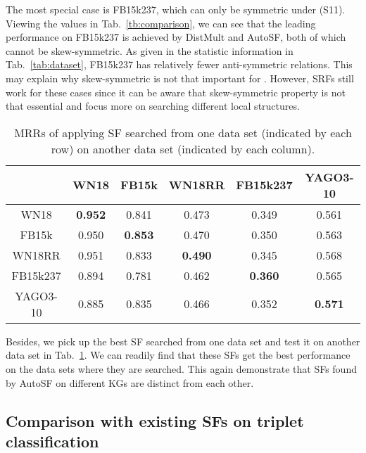 \documentclass[conference]{IEEEtran}
\begin{document}
The most special case is FB15k237, which can only be symmetric under (S11).
Viewing the values in Tab.~\ref{tb:comparison},
we can see that the leading performance on FB15k237 is achieved by DistMult and AutoSF,
both of which cannot be skew-symmetric.
As given in the statistic information in Tab.~\ref{tab:dataset},
FB15k237 has relatively fewer anti-symmetric relations.
This may explain why skew-symmetric is not that important for .
However,
SRFs still work for these cases
since it can be aware that skew-symmetric property is not that essential
and focus more on searching different local structures.

\begin{table}[ht] 
\centering
\vspace{-10px}
\caption{MRRs of applying SF searched from one data set (indicated by each row) on another data set (indicated by each column).}
\vspace{-10px}
\label{tab:dist}
\begin{tabular}{c|c|c|c|c|c}
	\hline
	                     &      WN18      &     FB15k      & WN18RR & FB15k237 & YAGO3-10 \\ \hline
	        WN18         & \textbf{0.952} &     0.841      &       0.473        &        0.349         &        0.561         \\ \hline
	       FB15k         &     0.950      & \textbf{0.853} &       0.470        &        0.350         &        0.563         \\ \hline
	       WN18RR        &     0.951      &     0.833      &   \textbf{0.490}   &        0.345         &        0.568         \\ \hline
	FB15k237 &     0.894      &     0.781      &       0.462        &    \textbf{0.360}    &        0.565         \\ \hline
	YAGO3-10 &     0.885      &     0.835      &       0.466        &        0.352         &    \textbf{0.571}    \\ \hline
\end{tabular}
\vspace{-5px}
\end{table}


Besides,
we pick up the best SF searched from one data set
and test it on another data set
in Tab.~\ref{tab:dist}.
We can readily
find that these SFs get the best performance
on the data sets where they are searched.
This again demonstrate that
SFs found by AutoSF on different KGs are distinct from each other.


\subsection{Comparison with existing SFs on triplet classification}
\label{ssec:tripclass}
\end{document}

